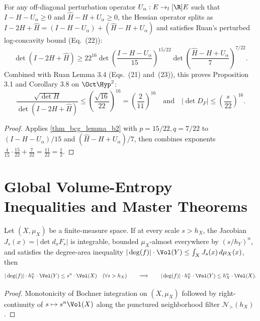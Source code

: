 \begin{theorem}
\label{thm_ruan_prop_3_1}
\leanok
{}
For any off-diagonal perturbation operator $U_\alpha : E \to_l[\R] E$ such that $I - H - U_\alpha \ge 0$ and $\widehat{H} - H + U_\alpha \ge 0$, the Hessian operator splits as $I - 2H + \widehat{H} = (I - H - U_\alpha) + (\widehat{H} - H + U_\alpha)$ and satisfies Ruan's perturbed log-concavity bound (Eq.~(22)):
$$\det(I - 2H + \widehat{H}) \ge 22^{16} \det\left(\frac{I - H - U_\alpha}{15}\right)^{15/22} \det\left(\frac{\widehat{H} - H + U_\alpha}{7}\right)^{7/22}.$$
Combined with Ruan Lemma 3.4 (Eqs.~(21) and~(23)), this proves Proposition 3.1 and Corollary 3.8 on $\Oct\Hyp^2$:
$$\frac{\sqrt{\det H}}{\det(I - 2H + \widehat{H})} \le \left(\frac{\sqrt{16}}{22}\right)^{16} = \left(\frac{2}{11}\right)^{16} \quad\text{and}\quad |\det D_F| \le \left(\frac{s}{22}\right)^{16}.$$
\end{theorem}
\begin{proof}\leanok Applies \cref{thm_bcg_lemma_b2} with $p = 15/22, q = 7/22$ to $(I - H - U_\alpha)/15$ and $(\widehat{H} - H + U_\alpha)/7$, then combines exponents $\frac{4}{15}\cdot\frac{15}{22} + \frac{7}{22} = \frac{11}{22} = \frac{1}{2}$.\end{proof}

\chapter{Global Volume-Entropy Inequalities and Master Theorems}

\begin{theorem}
\label{thm_bcg_global_integration}
\leanok
{}
Let $(X, \mu_X)$ be a finite-measure space. If at every scale $s > h_X$, the Jacobian $J_s(x) = |\det d_x F_s|$ is integrable, bounded $\mu_X$-almost everywhere by $(s/h_Y)^n$, and satisfies the degree-area inequality $|\deg(f)|\cdot\Vol(Y) \le \int_X J_s(x)\,d\mu_X(x)$, then
$$|\deg(f)| \cdot h_Y^n \cdot \Vol(Y) \le s^n \cdot \Vol(X) \quad (\forall s > h_X) \qquad\Longrightarrow\qquad |\deg(f)| \cdot h_Y^n \cdot \Vol(Y) \le h_X^n \cdot \Vol(X).$$
\end{theorem}
\begin{proof}\leanok Monotonicity of Bochner integration on $(X, \mu_X)$ followed by right-continuity of $s \mapsto s^n \Vol(X)$ along the punctured neighborhood filter $\mathcal{N}_{>}(h_X)$.\end{proof}

